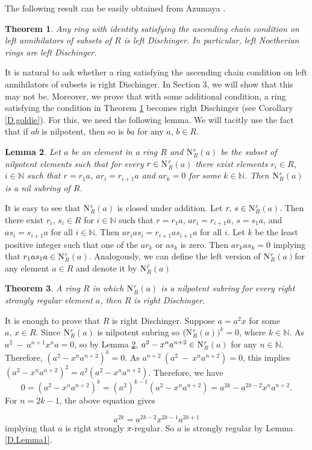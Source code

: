 \documentclass[12pt]{article}
\makeatletter
\theoremstyle{plain}
\newtheorem{thm}{Theorem}[section]
\newtheorem{lemma}[thm]{Lemma}
\theoremstyle{definition}
\renewenvironment{proof}[1][\proofname]{%
	\par\pushQED{\qed}%
	\normalfont %
	\topsep6\p@\@plus6\p@\relax
	\trivlist
	\item[\hskip\labelsep\bfseries #1\@addpunct{.}]%
}{%
	\popQED\endtrivlist\@endpefalse
}
\renewcommand{\proofname}{Proof}
\makeatother
\begin{document}
	The following result can be easily obtained from Azumaya \cite[Theorem 2]{Az}.
	\begin{thm}\label{D.leftacc}
		Any ring with identity satisfying the ascending chain condition on left annihilators of subsets of $R$ is left Dischinger. In particular, left Noetherian rings are left Dischinger.
	\end{thm}
	It is natural to ask whether a ring satisfying the ascending chain condition on left annihilators of subsets is right Dischinger. In Section 3, we will show that this may not be. Moreover, we prove that with some additional condition, a ring satisfying the condition in Theorem \ref{D.leftacc} becomes right Dischinger (see Corollary \ref{D.goldie}). For this, we need the following lemma. We will tacitly use the fact that if $ab$ is nilpotent, then so is $ba$ for any $a,\,b \in R$.
	\begin{lemma}\label{D.Nra}
		Let $a$ be an element in a ring $R$ and $\rm{N}$$^r_R$$(a)$ be the subset of nilpotent elements such that for every $r \in \rm{N}$$^r_R$$(a)$ there exist elements $r_i \in R$, $i \in \mathbb{N}$ such that $r=r_1a$, $ar_i =  r_{i+1}a$ and $ar_k = 0$ for some $k \in \mathbb{N}$. Then $\rm{N}$$^r_R$$(a)$ is a nil subring of $R$.
	\end{lemma}
	\begin{proof}
		It is easy to see that $\rm{N}$$^r_R$$(a)$ is closed under addition. Let $r,\, s \in \rm{N}$$^r_R$$(a)$.  Then there exist $r_i,\,s_i \in R$ for $i \in \mathbb{N}$ such that $r=r_1a$, $ ar_i =  r_{i+1}a$, $s=s_1a$, and  $as_i =  s_{i+1}a$ for all $i \in \mathbb N$. Then $ar_ias_i = r_{i+1}as_{i+1}a$ for all $i$. Let $k$ be the least positive integer such that one of the $ar_k$ or $as_k$ is zero. Then $ar_kas_k = 0$ implying that $r_1as_1a \in \rm{N}$$^r_R$$(a)$.
	\end{proof}
	Analogously, we can define the left version of $\rm{N}$$^r_R$$(a)$for any element $a \in R$ and denote it by $\rm{N}$$^{\ell}_R$$(a)$
	\begin{thm}\label{D.Nra2}
		A ring $R$ in which $\rm{N}$$^r_R$$(a)$ is a nilpotent subring for every right strongly regular element $a$, then $R$ is right Dischinger.
	\end{thm}
	\begin{proof}
		It is enough to prove that $R$ is right Dischinger. Suppose $a = a^2x$ for some $a,\,x \in R$. Since $\rm{N}$$^r_R$$(a)$ is nilpotent subring so $(\rm{N}$$^r_R$$(a))^k = 0$, where $k \in \mathbb{N}$.  As $a^2~-~a^{n+1}x^na = 0$, so by Lemma \ref{D.Nra}, $a^2-x^na^{n+2} \in\rm{N}$$^r_R$$(a)$ for any $n \in \mathbb{N}$. Therefore, $(a^2-x^na^{n+2})^k= 0$. As $a^{n+2}~(a^2~-~x^na^{n+2}) = 0$, this implies $ (a^2-x^na^{n+2})^2=a^2(a^2-x^na^{n+2})$. Therefore, we have $$0=(a^2-x^na^{n+2})^k=(a^2)^{k-1}(a^2-x^na^{n+2})=a^{2k}-a^{2k-2}x^na^{n+2}.$$ For $n=2k-1$, the above equation gives
		
		$$a^{2k}=a^{2k-2}x^{2k-1}a^{2k+1}$$ implying that $a$ is right strongly $\pi$-regular. So $a$ is strongly regular by Lemma \ref{D.Lemma1}.	
	\end{proof}
	
\end{document}
